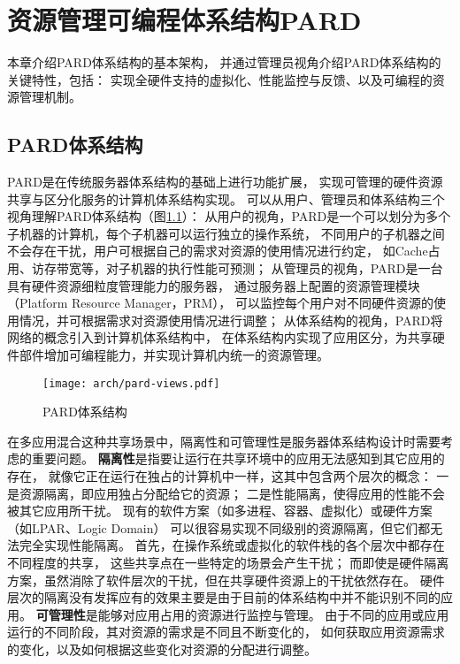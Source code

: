 

\chapter{资源管理可编程体系结构PARD}
\label{chap:pardarch}

本章介绍PARD体系结构的基本架构，
并通过管理员视角介绍PARD体系结构的关键特性，包括：
实现全硬件支持的虚拟化、性能监控与反馈、以及可编程的资源管理机制。

\section{PARD体系结构}

PARD是在传统服务器体系结构的基础上进行功能扩展，
实现可管理的硬件资源共享与区分化服务的计算机体系结构实现。
可以从用户、管理员和体系结构三个视角理解PARD体系结构（图\ref{fig:pard-views}）：
从用户的视角，PARD是一个可以划分为多个子机器的计算机，每个子机器可以运行独立的操作系统，
不同用户的子机器之间不会存在干扰，用户可根据自己的需求对资源的使用情况进行约定，
如Cache占用、访存带宽等，对子机器的执行性能可预测；
从管理员的视角，PARD是一台具有硬件资源细粒度管理能力的服务器，
通过服务器上配置的资源管理模块（Platform Resource Manager，PRM），
可以监控每个用户对不同硬件资源的使用情况，并可根据需求对资源使用情况进行调整；
从体系结构的视角，PARD将网络的概念引入到计算机体系结构中，
在体系结构内实现了应用区分，为共享硬件部件增加可编程能力，并实现计算机内统一的资源管理。

\begin{figure}[t]
  \centering
  \texttt{[image: arch/pard-views.pdf]}
  \caption{PARD体系结构}
  \label{fig:pard-views}
\end{figure}

在多应用混合这种共享场景中，隔离性和可管理性是服务器体系结构设计时需要考虑的重要问题。
\textbf{隔离性}是指要让运行在共享环境中的应用无法感知到其它应用的存在，
就像它正在运行在独占的计算机中一样，这其中包含两个层次的概念：
一是资源隔离，即应用独占分配给它的资源；
二是性能隔离，使得应用的性能不会被其它应用所干扰。
现有的软件方案（如多进程、容器、虚拟化）或硬件方案（如LPAR、Logic Domain）
可以很容易实现不同级别的资源隔离，但它们都无法完全实现性能隔离。
首先，在操作系统或虚拟化的软件栈的各个层次中都存在不同程度的共享，
这些共享点在一些特定的场景会产生干扰；
而即使是硬件隔离方案，虽然消除了软件层次的干扰，但在共享硬件资源上的干扰依然存在。
硬件层次的隔离没有发挥应有的效果主要是由于目前的体系结构中并不能识别不同的应用。
\textbf{可管理性}是能够对应用占用的资源进行监控与管理。
由于不同的应用或应用运行的不同阶段，其对资源的需求是不同且不断变化的，
如何获取应用资源需求的变化，以及如何根据这些变化对资源的分配进行调整。


